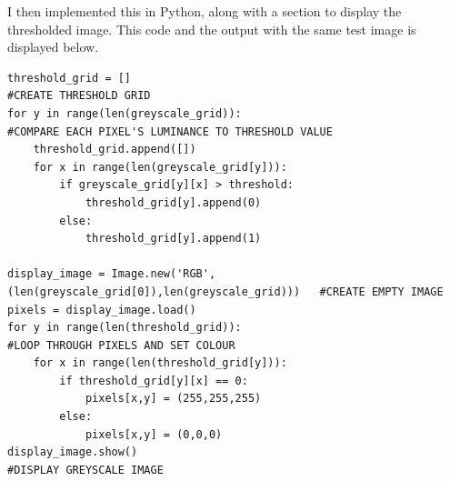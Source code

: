 \documentclass[titlepage]{article}
\begin{document}
I then implemented this in Python, along with a section to display the thresholded image. This code and the output with the same test image is displayed below.

\begin{changemargin}{-1in}{-1in} 
\begin{verbatim}
threshold_grid = []                                                             #CREATE THRESHOLD GRID
for y in range(len(greyscale_grid)):                                            #COMPARE EACH PIXEL'S LUMINANCE TO THRESHOLD VALUE
    threshold_grid.append([])
    for x in range(len(greyscale_grid[y])):
        if greyscale_grid[y][x] > threshold:
            threshold_grid[y].append(0)
        else:
            threshold_grid[y].append(1)

display_image = Image.new('RGB',(len(greyscale_grid[0]),len(greyscale_grid)))   #CREATE EMPTY IMAGE
pixels = display_image.load()
for y in range(len(threshold_grid)):                                            #LOOP THROUGH PIXELS AND SET COLOUR 
    for x in range(len(threshold_grid[y])):
        if threshold_grid[y][x] == 0:
            pixels[x,y] = (255,255,255)
        else:
            pixels[x,y] = (0,0,0)
display_image.show()                                                            #DISPLAY GREYSCALE IMAGE
\end{verbatim}
\end{changemargin} 
\end{document}
